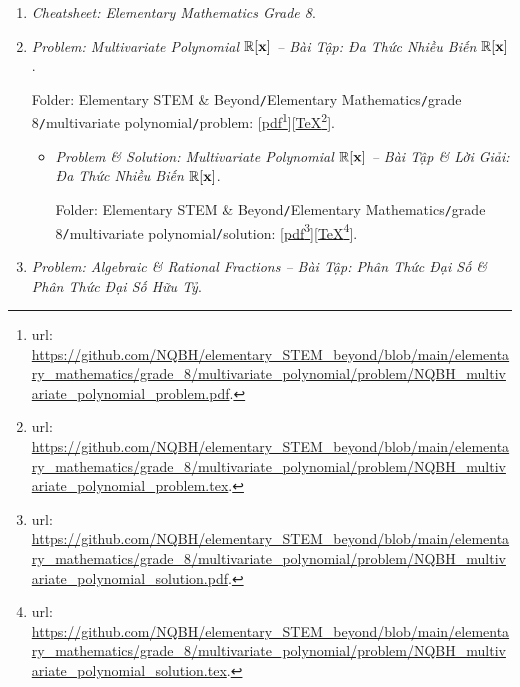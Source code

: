 \documentclass[12pt]{article}
\begin{document}
\begin{enumerate}
	\item {\it Cheatsheet: Elementary Mathematics Grade 8}.
	\item {\it Problem: Multivariate Polynomial $\mathbb{R}[{\bf x}]$ -- Bài Tập: Đa Thức Nhiều Biến $\mathbb{R}[{\bf x}]$}.
	
	Folder: {\sf Elementary STEM \& Beyond{\tt/}Elementary Mathematics{\tt/}grade 8{\tt/}multivariate polynomial{\tt/}problem}: [\href{https://github.com/NQBH/elementary_STEM_beyond/blob/main/elementary_mathematics/grade_8/multivariate_polynomial/problem/NQBH_multivariate_polynomial_problem.pdf}{pdf}\footnote{{\sc url}: \url{https://github.com/NQBH/elementary_STEM_beyond/blob/main/elementary_mathematics/grade_8/multivariate_polynomial/problem/NQBH_multivariate_polynomial_problem.pdf}.}][\href{https://github.com/NQBH/elementary_STEM_beyond/blob/main/elementary_mathematics/grade_8/multivariate_polynomial/problem/NQBH_multivariate_polynomial_problem.tex}{\TeX}\footnote{{\sc url}: \url{https://github.com/NQBH/elementary_STEM_beyond/blob/main/elementary_mathematics/grade_8/multivariate_polynomial/problem/NQBH_multivariate_polynomial_problem.tex}.}].
	\begin{itemize}
		\item {\it Problem \& Solution: Multivariate Polynomial $\mathbb{R}[{\bf x}]$ -- Bài Tập \& Lời Giải: Đa Thức Nhiều Biến $\mathbb{R}[{\bf x}]$}.
		
		Folder: {\sf Elementary STEM \& Beyond{\tt/}Elementary Mathematics{\tt/}grade 8{\tt/}multivariate polynomial{\tt/}solution}: [\href{https://github.com/NQBH/elementary_STEM_beyond/blob/main/elementary_mathematics/grade_8/multivariate_polynomial/problem/NQBH_multivariate_polynomial_solution.pdf}{pdf}\footnote{{\sc url}: \url{https://github.com/NQBH/elementary_STEM_beyond/blob/main/elementary_mathematics/grade_8/multivariate_polynomial/problem/NQBH_multivariate_polynomial_solution.pdf}.}][\href{https://github.com/NQBH/elementary_STEM_beyond/blob/main/elementary_mathematics/grade_8/multivariate_polynomial/problem/NQBH_multivariate_polynomial_solution.tex}{\TeX}\footnote{{\sc url}: \url{https://github.com/NQBH/elementary_STEM_beyond/blob/main/elementary_mathematics/grade_8/multivariate_polynomial/problem/NQBH_multivariate_polynomial_solution.tex}.}].
	\end{itemize}
	\item {\it Problem: Algebraic \& Rational Fractions -- Bài Tập: Phân Thức Đại Số \& Phân Thức Đại Số Hữu Tỷ}.
	

\end{enumerate}
\end{document}
